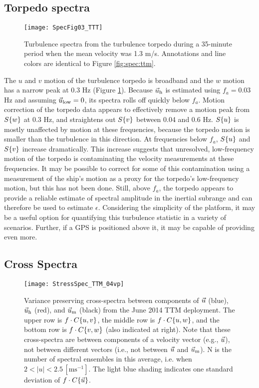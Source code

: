 \subsection{Torpedo spectra}

\begin{figure}[t]
  \centering
  \texttt{[image: SpecFig03\_TTT]}
  \caption{Turbulence spectra from the turbulence torpedo during a 35-minute period when the mean velocity was 1.3 m/s. Annotations and line colors are identical to Figure \ref{fig:spec:ttm}.}
  \label{fig:spec:torpedo}
\end{figure}

The $u$ and $v$ motion of the turbulence torpedo is broadband and the $w$ motion has a narrow peak at 0.3 Hz (Figure \ref{fig:spec:torpedo}). Because $\vec{u}_\mathrm{h}$ is estimated using $f_a = 0.03$ Hz and assuming $\vec{u}_\mathrm{low}=0$, its spectra rolls off quickly below $f_a$.  Motion correction of the torpedo data appears to effectively remove a motion peak from $S\{w\}$ at 0.3 Hz, and straightens out $S\{v\}$ between 0.04 and 0.6 Hz. $S\{u\}$ is mostly unaffected by motion at these frequencies, because the torpedo motion is smaller than the turbulence in this direction. At frequencies below $f_a$, $S\{u\}$ and $S\{v\}$ increase dramatically. This increase suggests that unresolved, low-frequency motion of the torpedo is contaminating the velocity measurements at these frequencies. It may be possible to correct for some of this contamination using a measurement of the ship's motion as a proxy for the torpedo's low-frequency motion, but this has not been done. Still, above $f_a$, the torpedo appears to provide a reliable estimate of spectral amplitude in the inertial subrange and can therefore be used to estimate $\epsilon$. Considering the simplicity of the platform, it may be a useful option for quantifying this turbulence statistic in a variety of scenarios. Further, if a GPS is positioned above it, it may be capable of providing even more.


\subsection{Cross Spectra}

\begin{figure}[t]
  \centering
  \texttt{[image: StressSpec\_TTM\_04vp]}
  \caption{Variance preserving cross-spectra between components of $\vec{u}$ (blue), $\vec{u}_\mathrm{h}$ (red), and $\vec{u}_\mathrm{m}$ (black) from the June 2014 TTM deployment. The upper row is $f \cdot C\{u,v\}$, the middle row is $f \cdot C\{u,w\}$, and the bottom row is $f \cdot C\{v,w\}$ (also indicated at right).  Note that these cross-spectra are between components of a velocity vector (e.g., $\vec{u}$), not between different vectors (i.e., not between $\vec{u}$ and $\vec{u}_\mathrm{m}$). N is the number of spectral ensembles in this average, i.e. when $2 < |u| < 2.5\,\mathrm{[ms^{-1}]}$. The light blue shading indicates one standard deviation of $f \cdot C\{\vec{u}\}$.}
  \label{fig:cspec:ttm}
\end{figure}


